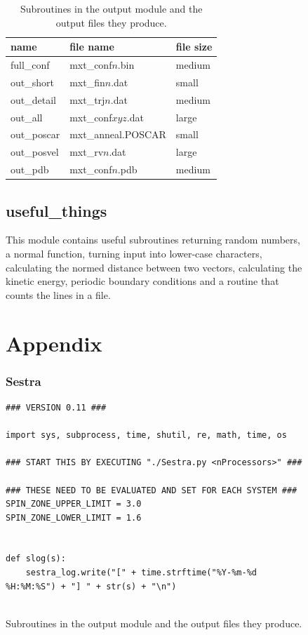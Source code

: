\documentclass[twoside, 11pt, titlepage, captions=nooneline, a4paper, headsepline]{scrbook}%
\newcommand{\9}{\mathrm}
\newcommand{\0}{\,\mathrm}
\begin{document}
\begin{figure}[b!]
\begin{table}[b!]
\centering
\caption{Subroutines in the output module and the output files they produce.}
\label{Tab:Funct:output}
\begin{tabular}{lll}
\hline\hline
name			&file name			& file size\\
\hline
full\_conf		&mxt\_conf$n$.bin	&medium\\
out\_short		&mxt\_fin$n$.dat 	&small\\
out\_detail		&mxt\_trj$n$.dat	&medium\\
out\_all		&mxt\_conf$xyz$.dat	&large\\
out\_poscar		&mxt\_anneal.POSCAR	&small\\
out\_posvel		&mxt\_rv$n$.dat		&large\\
out\_pdb		&mxt\_conf$n$.pdb	&medium\\
\hline
\hline
\end{tabular}
\end{table}

\section{useful\_things}
This module contains useful subroutines returning random numbers, a normal function, turning input into lower-case characters, calculating the normed distance between two vectors, calculating the kinetic energy, periodic boundary conditions and a routine that counts the lines in a file.


\chapter{Appendix}

\subsection{Sestra}
\label{Sestra}

\begin{lstlisting}
### VERSION 0.11 ###

import sys, subprocess, time, shutil, re, math, time, os

### START THIS BY EXECUTING "./Sestra.py <nProcessors>" ###

### THESE NEED TO BE EVALUATED AND SET FOR EACH SYSTEM ###
SPIN_ZONE_UPPER_LIMIT = 3.0
SPIN_ZONE_LOWER_LIMIT = 1.6


def slog(s):
    sestra_log.write("[" + time.strftime("%Y-%m-%d %H:%M:%S") + "] " + str(s) + "\n")


\end{lstlisting}
\end{figure}
\end{document}
